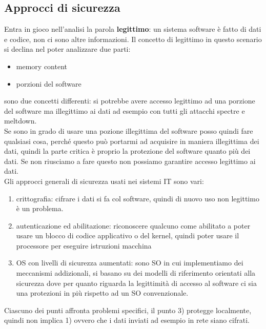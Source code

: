 \documentclass[12pt, oneside]{extbook}
\begin{document}
\subsection{Approcci di sicurezza}
Entra in gioco nell'analisi la parola \textbf{legittimo}: un sistema software è fatto di dati e codice, non ci sono altre informazioni. Il concetto di legittimo in questo scenario si declina nel poter analizzare due parti:
\begin{itemize}
	\item memory content
	\item porzioni del software
\end{itemize}
sono due concetti differenti: si potrebbe avere accesso legittimo ad una porzione del software ma illegittimo ai dati ad esempio con tutti gli attacchi spectre e meltdown.\\Se sono in grado di usare una pozione illegittima del software posso quindi fare qualsiasi cosa, perché questo può portarmi ad acquisire in maniera illegittima dei dati, quindi la parte critica è proprio la protezione del software quanto più dei dati. Se non riusciamo a fare questo non possiamo garantire accesso legittimo ai dati.\\Gli approcci generali di sicurezza usati nei sistemi IT sono vari:
\begin{enumerate}
	\item crittografia: cifrare i dati si fa col software, quindi di nuovo uso non legittimo è un problema.
	\item autenticazione ed abilitazione: riconoscere qualcuno come abilitato a poter usare un blocco di codice applicativo o del kernel, quindi poter usare il processore per eseguire istruzioni macchina
	\item OS con livelli di sicurezza aumentati: sono SO in cui implementiamo dei meccanismi addizionali, si basano su dei modelli di riferimento orientati alla sicurezza dove per quanto riguarda la legittimità di accesso al software ci sia una protezioni in più rispetto ad un SO convenzionale.
\end{enumerate}
Ciascuno dei punti affronta problemi specifici, il punto 3) protegge localmente, quindi non implica 1) ovvero che i dati inviati ad esempio in rete siano cifrati.
\end{document}
